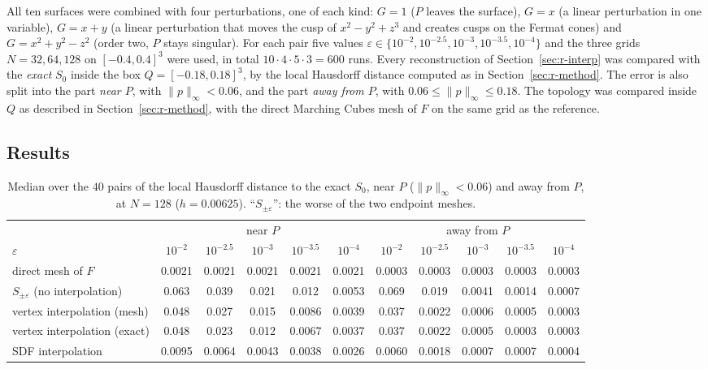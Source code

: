 \documentclass[12pt, a4paper, oneside]{book}
\theoremstyle{plain}
\theoremstyle{definition}
\theoremstyle{remark}
\theoremstyle{definition}
\begin{document}
All ten surfaces were combined with four perturbations, one of each kind: $G=1$ ($P$ leaves the surface), $G=x$ (a linear perturbation in one variable), $G=x+y$ (a linear perturbation that moves the cusp of $x^2-y^2+z^3$ and creates cusps on the Fermat cones) and $G=x^2+y^2-z^2$ (order two, $P$ stays singular). For each pair five values $\varepsilon\in\{10^{-2},10^{-2.5},10^{-3},10^{-3.5},10^{-4}\}$ and the three grids $N=32,64,128$ on $[-0.4,0.4]^3$ were used, in total $10\cdot4\cdot5\cdot3=600$ runs. Every reconstruction of Section~\ref{sec:r-interp} was compared with the \emph{exact} $S_0$ inside the box $Q=[-0.18,0.18]^3$, by the local Hausdorff distance computed as in Section~\ref{sec:r-method}. The error is also split into the part \emph{near $P$}, with $\|p\|_\infty<0.06$, and the part \emph{away from $P$}, with $0.06\le\|p\|_\infty\le0.18$. The topology was compared inside $Q$ as described in Section~\ref{sec:r-method}, with the direct Marching Cubes mesh of $F$ on the same grid as the reference.

\subsection{Results}

\begin{table}[!h]
\centering
\small
\begin{adjustbox}{max width=\textwidth}
\begin{tabular}{l c c c c c c c c c c}
\toprule
& \multicolumn{5}{c}{near $P$} & \multicolumn{5}{c}{away from $P$} \\
\cmidrule(lr){2-6}\cmidrule(lr){7-11}
$\varepsilon$ & $10^{-2}$ & $10^{-2.5}$ & $10^{-3}$ & $10^{-3.5}$ & $10^{-4}$ & $10^{-2}$ & $10^{-2.5}$ & $10^{-3}$ & $10^{-3.5}$ & $10^{-4}$ \\
\midrule
direct mesh of $F$       & 0.0021 & 0.0021 & 0.0021 & 0.0021 & 0.0021 & 0.0003 & 0.0003 & 0.0003 & 0.0003 & 0.0003 \\
$S_{\pm\varepsilon}$ (no interpolation) & 0.063 & 0.039 & 0.021 & 0.012 & 0.0053 & 0.069 & 0.019 & 0.0041 & 0.0014 & 0.0007 \\
vertex interpolation (mesh)  & 0.048 & 0.027 & 0.015 & 0.0086 & 0.0039 & 0.037 & 0.0022 & 0.0006 & 0.0005 & 0.0003 \\
vertex interpolation (exact) & 0.048 & 0.023 & 0.012 & 0.0067 & 0.0037 & 0.037 & 0.0022 & 0.0005 & 0.0003 & 0.0003 \\
SDF interpolation            & 0.0095 & 0.0064 & 0.0043 & 0.0038 & 0.0026 & 0.0060 & 0.0018 & 0.0007 & 0.0007 & 0.0004 \\
\bottomrule
\end{tabular}
\end{adjustbox}
\caption[Interpolation: median errors]{Median over the $40$ pairs of the local Hausdorff distance to the exact $S_0$, near $P$ ($\|p\|_\infty<0.06$) and away from $P$, at $N=128$ ($h=0.00625$). ``$S_{\pm\varepsilon}$'': the worse of the two endpoint meshes.}
\label{tab:interp-median}
\end{table}
\end{document}
